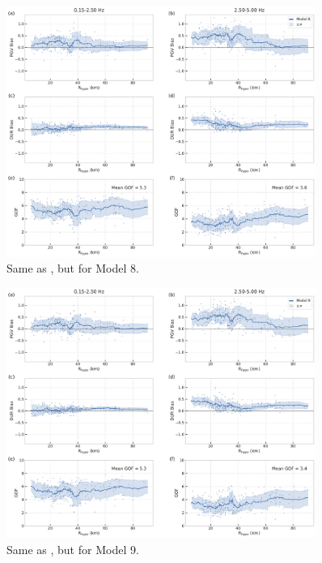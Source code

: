 \begin{figure}[!ht]
  \centering
  \includegraphics[width=0.9\textwidth,height=0.9\textheight,keepaspectratio]{figures/figure_highf_S18.pdf}
  \caption{Same as , but for Model 8.
  }
\label{fig:highf-S18}
\end{figure}
\clearpage


\begin{figure}[!ht]
  \centering
  \includegraphics[width=0.9\textwidth,height=0.9\textheight,keepaspectratio]{figures/figure_highf_S19.pdf}
  \caption{Same as , but for Model 9.
  }
\label{fig:highf-S19}
\end{figure}
\clearpage


